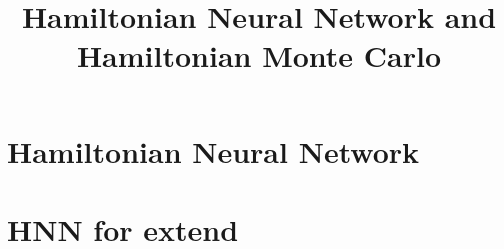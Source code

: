 \documentclass[11pt,a4paper]{article}
\title{Hamiltonian Neural Network and Hamiltonian Monte Carlo}
\theoremstyle{remark}
\begin{document}
\maketitle

\section{Hamiltonian Neural Network}

\section{HNN for extend }




\end{document}
